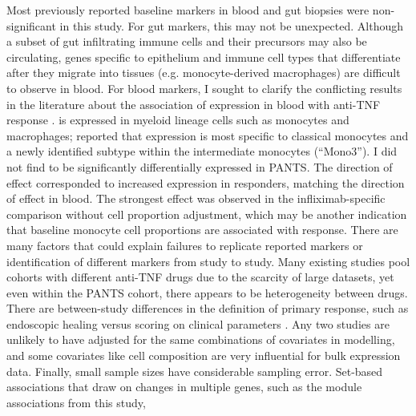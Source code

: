 Most previously reported baseline markers in blood and gut biopsies were non-significant in this study.
For gut markers, this may not be unexpected.
Although a subset of gut infiltrating immune cells and their precursors may also be circulating,
genes specific to epithelium and immune cell types that differentiate after they migrate into tissues (e.g. monocyte-derived macrophages) are difficult to observe in blood.
For blood markers, I sought to clarify the conflicting results in the literature about the association of  expression in blood with anti-\gls{TNF} response \autocite{gaujoux2019CellcentredMetaanalysisReveals,verstockt2019LowTREM1Expression}.
 is expressed in myeloid lineage cells such as monocytes and macrophages;
\textcite{villani2017SinglecellRNAseqReveals} reported that  expression is most specific to classical monocytes and a newly identified subtype within the intermediate monocytes (\enquote{Mono3}).
I did not find  to be significantly differentially expressed in \gls{PANTS}.
The direction of effect corresponded to increased expression in responders,
matching the \textcite{gaujoux2019CellcentredMetaanalysisReveals} direction of effect in blood.
The strongest effect was observed in the infliximab-specific comparison without cell proportion adjustment,
which may be another indication that baseline monocyte cell proportions are associated with response.
%
There are many factors that could explain failures to replicate reported markers or identification of different markers from study to study.
Many existing studies pool cohorts with different anti-\gls{TNF} drugs due to the scarcity of large datasets,
yet even within the \gls{PANTS} cohort, there appears to be heterogeneity between drugs.
There are between-study differences in the definition of primary response,
such as endoscopic healing \autocite{gaujoux2019CellcentredMetaanalysisReveals} versus scoring on clinical parameters \autocite{verstockt2019LowTREM1Expression}.
Any two studies are unlikely to have adjusted for the same combinations of covariates in modelling,
and some covariates like cell composition are very influential for bulk expression data.
Finally, small sample sizes have considerable sampling error.
Set-based associations that draw on changes in multiple genes,
such as the module associations from this study,
